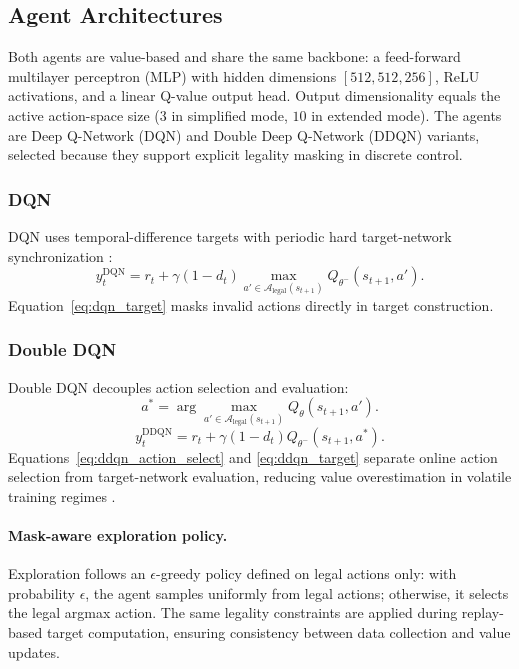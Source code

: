 \subsection{Agent Architectures}
Both agents are value-based and share the same backbone: a feed-forward multilayer perceptron (MLP) with hidden dimensions $[512,512,256]$, ReLU activations, and a linear Q-value output head. Output dimensionality equals the active action-space size ($3$ in simplified mode, $10$ in extended mode). The agents are Deep Q-Network (DQN) and Double Deep Q-Network (DDQN) variants, selected because they support explicit legality masking in discrete control.

\subsubsection{DQN}
DQN uses temporal-difference targets with periodic hard target-network synchronization \citep{mnih2015humanlevel}:
\begin{equation}
y_t^{\text{DQN}} = r_t + \gamma (1-d_t)\max_{a' \in \mathcal{A}_{\text{legal}}(s_{t+1})} Q_{\theta^-}(s_{t+1}, a').
\label{eq:dqn_target}
\end{equation}
Equation~\ref{eq:dqn_target} masks invalid actions directly in target construction.

\subsubsection{Double DQN}
Double DQN decouples action selection and evaluation:
\begin{equation}
a^* = \arg\max_{a' \in \mathcal{A}_{\text{legal}}(s_{t+1})} Q_{\theta}(s_{t+1}, a').
\label{eq:ddqn_action_select}
\end{equation}
\begin{equation}
y_t^{\text{DDQN}} = r_t + \gamma (1-d_t) Q_{\theta^-}(s_{t+1}, a^*).
\label{eq:ddqn_target}
\end{equation}
Equations~\ref{eq:ddqn_action_select} and \ref{eq:ddqn_target} separate online action selection from target-network evaluation, reducing value overestimation in volatile training regimes \citep{hasselt2016deep}.

\paragraph{Mask-aware exploration policy.}
Exploration follows an $\epsilon$-greedy policy defined on legal actions only: with probability $\epsilon$, the agent samples uniformly from legal actions; otherwise, it selects the legal argmax action. The same legality constraints are applied during replay-based target computation, ensuring consistency between data collection and value updates.

